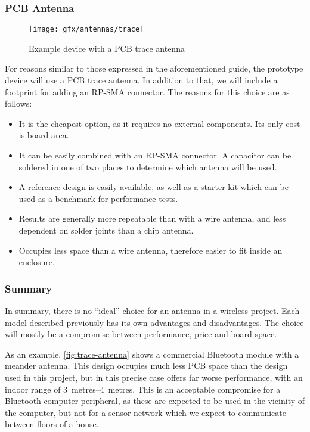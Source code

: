 \subsubsection{PCB Antenna}

\begin{figure}[bth]
  \begin{center}
    \texttt{[image: gfx/antennas/trace]}
  \end{center}
  \caption{Example device with a PCB trace antenna}
  \label{fig:trace-antenna}
\end{figure}

For reasons similar to those expressed in the aforementioned guide, the
prototype device will use a PCB trace antenna. In addition to that, we will
include a footprint for adding an RP-SMA connector. The reasons for this choice
are as follows:

\begin{itemize}
  \item It is the cheapest option, as it requires no external components. Its
    only cost is board area.
  \item It can be easily combined with an RP-SMA connector. A capacitor can be
    soldered in one of two places to determine which antenna will be used. 
  \item A reference design is easily available, as well as a starter kit which
    can be used as a benchmark for performance tests.
  \item Results are generally more repeatable than with a wire antenna, and less
    dependent on solder joints than a chip antenna.
  \item Occupies less space than a wire antenna, therefore easier to fit inside
    an enclosure.
\end{itemize}

\subsubsection{Summary}

In summary, there is no ``ideal'' choice for an antenna in a wireless project.
Each model described previously has its own advantages and disadvantages. The
choice will mostly be a compromise between performance, price and board space.

As an example, \autoref{fig:trace-antenna} shows a commercial Bluetooth module
with a meander antenna. This design occupies much less PCB space than the design
used in this project, but in this precise case offers far worse performance,
with an indoor range of \SIrange{3}{4}{metres}. This is an acceptable compromise
for a Bluetooth computer peripheral, as these are expected to be used in the
vicinity of the computer, but not for a sensor network which we expect to
communicate between floors of a house.

